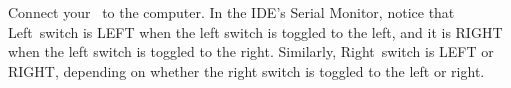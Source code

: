 

Connect your \developmentboard\ to the computer.
In the IDE's Serial Monitor, notice that Left~switch is LEFT when the left switch is toggled to the left, and it is RIGHT when the left switch is toggled to the right.
Similarly, Right~switch is LEFT or RIGHT, depending on whether the right switch is toggled to the left or right.